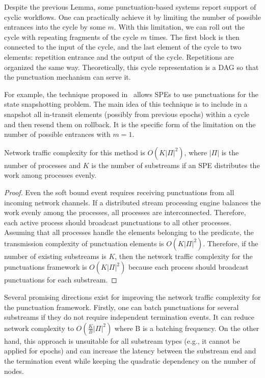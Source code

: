 Despite the previous Lemma, some punctuation-based systems report support of cyclic workflows. One can practically achieve it by limiting the number of possible entrances into the cycle by some $m$. With this limitation, we can roll out the cycle with repeating fragments of the cycle $m$ times. The first block is then connected to the input of the cycle, and the last element of the cycle to two elements: repetition entrance and the output of the cycle. Repetitions are organized the same way. Theoretically, this cycle representation is a DAG so that the punctuation mechanism can serve it.

For example, the technique proposed in~\cite{Carbone:2017:SMA:3137765.3137777} allows SPEs to use punctuations for the state snapshotting problem. The main idea of this technique is to include in a snapshot all in-transit elements (possibly from previous epochs) within a cycle and then resend them on rollback. It is the specific form of the limitation on the number of possible entrances with $m=1$.

\begin{lemma}
Network traffic complexity for this method is $O(K|\Pi|^2)$, where $|\Pi|$ is the number of processes and $K$ is the number of substreams if an SPE distributes the work among processes evenly.
\end{lemma}
\begin{proof}

Even the soft bound event requires receiving punctuations from all incoming network channels. If a distributed stream processing engine balances the work evenly among the processes, all processes are interconnected. Therefore, each active process should broadcast punctuations to all other processes. Assuming that all processes handle the elements belonging to the predicate, the transmission complexity of punctuation elements is $O(K|\Pi|^2)$. Therefore, if the number of existing substreams is $K$, then the network traffic complexity for the punctuations framework is $O(K|\Pi|^2)$ because each process should broadcast punctuations for each substream. 

\end{proof}

Several promising directions exist for improving the network traffic complexity for the punctuation framework. Firstly, one can batch punctuations for several substreams if they do not require independent termination events. It can reduce network complexity to $O(\frac{K}{B}|\Pi|^2)$ where B is a batching frequency. On the other hand, this approach is unsuitable for all substream types (e.g., it cannot be applied for epochs) and can increase the latency between the substream end and the termination event while keeping the quadratic dependency on the number of nodes.

